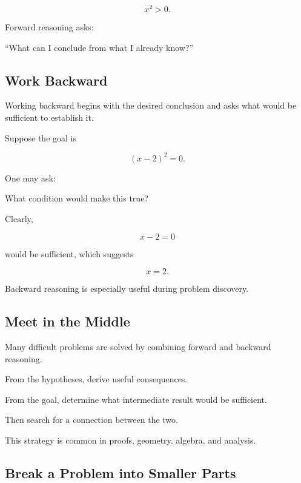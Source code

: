 \[ x^2>0. \]

Forward reasoning asks:

\begin{center}
``What can I conclude from what I already know?''
\end{center}

\subsection{Work Backward}
\label{subsec:work-backward}

Working backward begins with the desired conclusion and asks what would be
sufficient to establish it.

Suppose the goal is

\[ (x-2)^2=0. \]

One may ask:

\begin{center}
What condition would make this true?
\end{center}

Clearly,

\[ x-2=0 \]

would be sufficient, which suggests

\[ x=2. \]

Backward reasoning is especially useful during problem discovery.

\subsection{Meet in the Middle}
\label{subsec:meet-in-middle}

Many difficult problems are solved by combining forward and backward
reasoning.

From the hypotheses, derive useful consequences.

From the goal, determine what intermediate result would be sufficient.

Then search for a connection between the two.

This strategy is common in proofs, geometry, algebra, and analysis.

\subsection{Break a Problem into Smaller Parts}
\label{subsec:break-problem-smaller}

